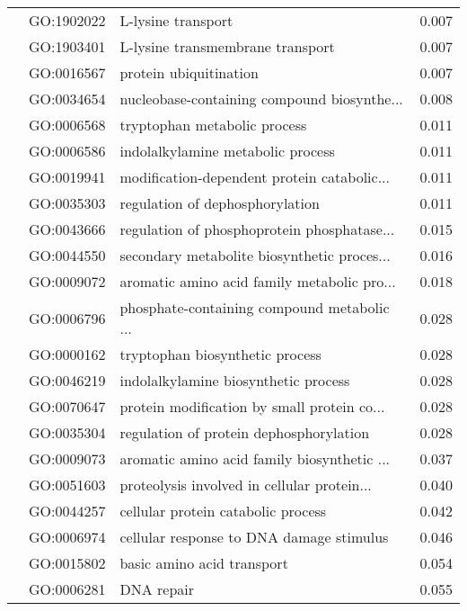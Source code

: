 \begin{longtable}{lllr}
   & GO:1902022 &                           L-lysine transport &         0.007 \\
   & GO:1903401 &             L-lysine transmembrane transport &         0.007 \\
   & GO:0016567 &                       protein ubiquitination &         0.007 \\
   & GO:0034654 &  nucleobase-containing compound biosynthe... &         0.008 \\
   & GO:0006568 &                 tryptophan metabolic process &         0.011 \\
   & GO:0006586 &            indolalkylamine metabolic process &         0.011 \\
   & GO:0019941 &  modification-dependent protein catabolic... &         0.011 \\
   & GO:0035303 &              regulation of dephosphorylation &         0.011 \\
   & GO:0043666 &  regulation of phosphoprotein phosphatase... &         0.015 \\
   & GO:0044550 &  secondary metabolite biosynthetic proces... &         0.016 \\
   & GO:0009072 &  aromatic amino acid family metabolic pro... &         0.018 \\
   & GO:0006796 &  phosphate-containing compound metabolic ... &         0.028 \\
   & GO:0000162 &              tryptophan biosynthetic process &         0.028 \\
   & GO:0046219 &         indolalkylamine biosynthetic process &         0.028 \\
   & GO:0070647 &  protein modification by small protein co... &         0.028 \\
   & GO:0035304 &      regulation of protein dephosphorylation &         0.028 \\
   & GO:0009073 &  aromatic amino acid family biosynthetic ... &         0.037 \\
   & GO:0051603 &  proteolysis involved in cellular protein... &         0.040 \\
   & GO:0044257 &           cellular protein catabolic process &         0.042 \\
   & GO:0006974 &     cellular response to DNA damage stimulus &         0.046 \\
   & GO:0015802 &                   basic amino acid transport &         0.054 \\
   & GO:0006281 &                                   DNA repair &         0.055 \\

\end{longtable}
